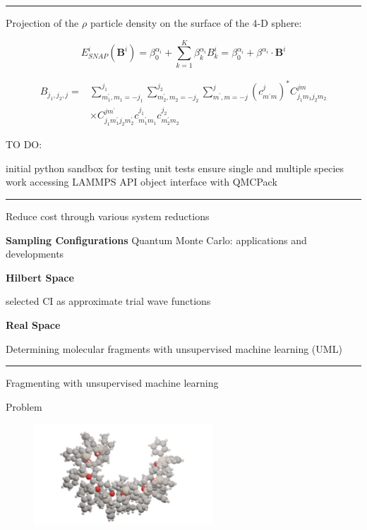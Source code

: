 \documentclass[
  letterpaper,
  DIV=11,
  numbers=noendperiod]{scrartcl}
\begin{document}
\begin{center}\rule{0.5\linewidth}{0.5pt}\end{center}

Projection of the \(\rho\) particle density on the surface of the 4-D
sphere:

\[E_{S N A P}^{i}\left(\mathbf{B}^{i}\right)=\beta_{0}^{\alpha_{i}}+\sum_{k=1}^K \beta_{k}^{\alpha_{i}} B_{k}^{i}=\beta_{0}^{\alpha_{i}}+\beta^{\alpha_{i}} \cdot \mathbf{B}^{i}\]

\[\begin{aligned} B_{j_{1}, j_{2}, j}=& \sum_{m_{1}^{\prime}, m_{1}=-j_{1}}^{j_{1}} \sum_{m_{2}^{\prime}, m_{2}=-j_{2}}^{j_{2}} \sum_{m^{\prime}, m=-j}^{j}\left(c_{m^{\prime} m}^{j}\right)^{*} C_{j_{1} m_{1} j_{2} m_{2}}^{j m} \\ & \times C_{j_{1} m_{1}^{\prime} j_{2} m_{2}^{\prime}}^{j m^{\prime}} c_{m_{1}^{\prime} m_{1}}^{j_{1}} c_{m_{2}^{\prime} m_{2}}^{j_{2}} \end{aligned}\]

TO DO:

initial python sandbox for testing unit tests ensure single and multiple
species work accessing LAMMPS API object interface with QMCPack

\begin{center}\rule{0.5\linewidth}{0.5pt}\end{center}

Reduce cost through various system reductions

\textbf{Sampling Configurations} Quantum Monte Carlo: applications and
developments

\textbf{Hilbert Space}

selected CI as approximate trial wave functions

\textbf{Real Space}

Determining molecular fragments with unsupervised machine learning (UML)

\begin{center}\rule{0.5\linewidth}{0.5pt}\end{center}

\leavevmode{}%
Fragmenting with unsupervised machine learning

Problem

\begin{figure}

{\centering \includegraphics[width=0.6\textwidth,height=\textheight]{images/large_polymer_example.png}

}

\end{figure}
\end{document}
